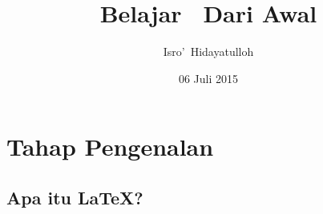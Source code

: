 \documentclass[12pt]{book}
\title{Belajar \LaTeXe\ Dari Awal}
\author{Isro\rq\ Hidayatulloh}
\date{06 Juli 2015}
\begin{document}
\maketitle
\newpage

\chapter{Tahap Pengenalan}

\section{Apa itu \LaTeX?}
\end{document}
